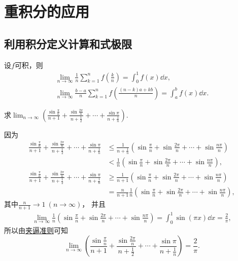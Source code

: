 \section{重积分的应用}
\subsection{利用积分定义计算和式极限}
设\(f\)可积，则\begin{gather*}
	\lim_{n\to\infty} \frac1n \sum_{k=1}^n f\left( \frac{k}{n} \right)
	= \int_0^1 f(x) \dd{x}, \\
	\lim_{n\to\infty} \frac{b-a}{n} \sum_{k=1}^n f\left( \frac{(n-k)a+kb}{n} \right)
	= \int_a^b f(x) \dd{x}.
\end{gather*}

\begin{example}
求\(\lim_{n\to\infty} \left( \frac{\sin\frac{\pi}{n}}{n+1} + \frac{\sin\frac{2\pi}{n}}{n+\frac12} + \dotsb + \frac{\sin\pi}{n+\frac1n} \right)\).
\begin{solution}
因为\begin{align*}
	\frac{\sin\frac{\pi}{n}}{n+1} + \frac{\sin\frac{2\pi}{n}}{n+\frac12} + \dotsb + \frac{\sin\pi}{n+\frac1n}
	&\leq \frac1{n+\frac1n} \left( \sin\frac{\pi}{n} + \sin\frac{2\pi}{n} + \dotsb + \sin\frac{n\pi}{n} \right) \\
	&< \frac1n \left( \sin\frac{\pi}{n} + \sin\frac{2\pi}{n} + \dotsb + \sin\frac{n\pi}{n} \right), \\
	\frac{\sin\frac{\pi}{n}}{n+1} + \frac{\sin\frac{2\pi}{n}}{n+\frac12} + \dotsb + \frac{\sin\pi}{n+\frac1n}
	&\geq \frac1{n+1} \left( \sin\frac{\pi}{n} + \sin\frac{2\pi}{n} + \dotsb + \sin\frac{n\pi}{n} \right) \\
	&= \frac{n}{n+1} \frac1n \left( \sin\frac{\pi}{n} + \sin\frac{2\pi}{n} + \dotsb + \sin\frac{n\pi}{n} \right),
\end{align*}
其中\(\frac{n}{n+1} \to 1\ (n\to\infty)\)，
并且\begin{align*}
	\lim_{n\to\infty} \frac1n \left( \sin\frac{\pi}{n} + \sin\frac{2\pi}{n} + \dotsb + \sin\frac{n\pi}{n} \right)
	= \int_0^1 \sin(\pi x) \dd{x} = \frac2\pi,
\end{align*}
所以由\hyperref[theorem:数列极限.夹逼准则]{夹逼准则}可知\[
	\lim_{n\to\infty} \left( \frac{\sin\frac{\pi}{n}}{n+1} + \frac{\sin\frac{2\pi}{n}}{n+\frac12} + \dotsb + \frac{\sin\pi}{n+\frac1n} \right)
	= \frac2\pi.
\]
\end{solution}
\end{example}
